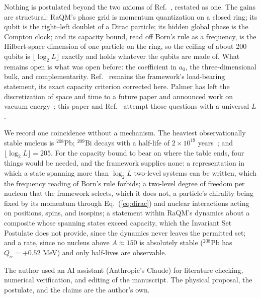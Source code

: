 \documentclass[aps,prd,twocolumn,superscriptaddress,nofootinbib]{revtex4-2}
\begin{document}
Nothing is postulated beyond the two axioms of Ref.~\cite{korytko2026}, restated as one. The gains are structural: RaQM's phase grid is momentum quantization on a closed ring; its qubit is the right--left doublet of a Dirac particle; its hidden global phase is the Compton clock; and its capacity bound, read off Born's rule as a frequency, is the Hilbert-space dimension of one particle on the ring, so the ceiling of about 200 qubits is $\lfloor\log_2 L\rfloor$ exactly and holds whatever the qubits are made of. What remains open is what was open before: the coefficient in $a_0$, the three-dimensional bulk, and complementarity. Ref.~\cite{korytko2026} remains the framework's load-bearing statement, its exact capacity criterion corrected here. Palmer has left the discretization of space and time to a future paper and announced work on vacuum energy~\cite{palmer2026c}; this paper and Ref.~\cite{korytko2026b} attempt those questions with a universal $L$.

We record one coincidence without a mechanism. The heaviest observationally stable nucleus is $^{208}$Pb; $^{209}$Bi decays with a half-life of $2\times10^{19}$ years~\cite{demarcillac2003,nubase2020}; and $\lfloor\log_2 L\rfloor = 205$. For the capacity bound to bear on where the table ends, four things would be needed, and the framework supplies none: a representation in which a state spanning more than $\log_2 L$ two-level systems can be written, which the frequency reading of Born's rule forbids; a two-level degree of freedom per nucleon that the framework selects, which it does not, a particle's chirality being fixed by its momentum through Eq.~(\ref{eq:dirac}) and nuclear interactions acting on positions, spins, and isospins; a statement within RaQM's dynamics about a composite whose spanning states exceed capacity, which the Invariant Set Postulate does not provide, since the dynamics never leaves the permitted set; and a rate, since no nucleus above $A\approx150$ is absolutely stable ($^{208}$Pb has $Q_\alpha = +0.52$ MeV) and only half-lives are observable.

\begin{acknowledgments}
The author used an AI assistant (Anthropic's Claude) for literature checking, numerical verification, and editing of the manuscript. The physical proposal, the postulate, and the claims are the author's own.
\end{acknowledgments}
\end{document}
